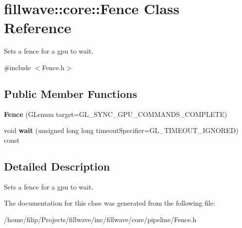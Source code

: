 \hypertarget{classfillwave_1_1core_1_1Fence}{}\section{fillwave\+:\+:core\+:\+:Fence Class Reference}
\label{classfillwave_1_1core_1_1Fence}


Sets a fence for a gpu to wait.  




{\ttfamily \#include $<$Fence.\+h$>$}

\subsection*{Public Member Functions}
\begin{DoxyCompactItemize}
\item 
\hypertarget{classfillwave_1_1core_1_1Fence_a0fc91f6b1c08d750e63fbe1c09c3ab5b}{}{\bfseries Fence} (G\+Lenum target=G\+L\+\_\+\+S\+Y\+N\+C\+\_\+\+G\+P\+U\+\_\+\+C\+O\+M\+M\+A\+N\+D\+S\+\_\+\+C\+O\+M\+P\+L\+E\+T\+E)\label{classfillwave_1_1core_1_1Fence_a0fc91f6b1c08d750e63fbe1c09c3ab5b}

\item 
\hypertarget{classfillwave_1_1core_1_1Fence_a572b541362c637618316016a6dc48eea}{}void {\bfseries wait} (unsigned long long timeout\+Specifier=G\+L\+\_\+\+T\+I\+M\+E\+O\+U\+T\+\_\+\+I\+G\+N\+O\+R\+E\+D) const \label{classfillwave_1_1core_1_1Fence_a572b541362c637618316016a6dc48eea}

\end{DoxyCompactItemize}


\subsection{Detailed Description}
Sets a fence for a gpu to wait. 

The documentation for this class was generated from the following file\+:\begin{DoxyCompactItemize}
\item 
/home/filip/\+Projects/fillwave/inc/fillwave/core/pipeline/Fence.\+h\end{DoxyCompactItemize}
